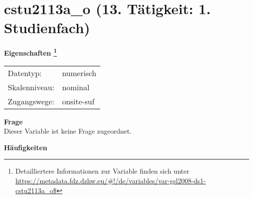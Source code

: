 
    \setcounter{footnote}{0}

    \vspace*{-1.8cm}
	\section{cstu2113a\_o (13. Tätigkeit: 1. Studienfach)}
	\label{section:cstu2113a_o}



    \vspace*{0.5cm}
    \noindent\textbf{Eigenschaften
	\footnote{Detailliertere Informationen zur Variable finden sich unter
		\url{https://metadata.fdz.dzhw.eu/\#!/de/variables/var-gsl2008-ds1-cstu2113a_o$}}}\\
	\begin{tabularx}{\hsize}{@{}lX}
	Datentyp: & numerisch \\
	Skalenniveau: & nominal \\
	Zugangswege: &
	  onsite-suf
 \\
    \end{tabularx}



		\vspace*{0.5cm}
		\noindent\textbf{Frage}\\
		Dieser Variable ist keine Frage zugeordnet.





        		\vspace*{0.5cm}
                \noindent\textbf{Häufigkeiten}

